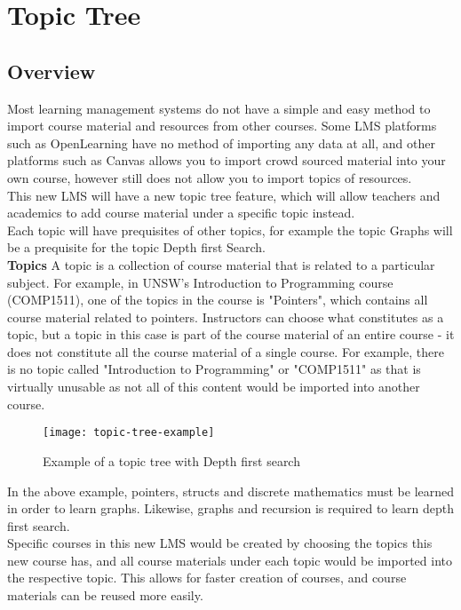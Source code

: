 \section{Topic Tree}
\subsection{Overview}
Most learning management systems do not have a simple and easy method to import course material and resources from other courses. Some LMS platforms such as OpenLearning have no method of importing any data at all, and other platforms such as Canvas allows you to import crowd sourced material into your own course, however still does not allow you to import topics of resources. \\

This new LMS will have a new topic tree feature, which will allow teachers and academics to add course material under a specific topic instead.\\
Each topic will have prequisites of other topics, for example the topic Graphs will be a prequisite for the topic Depth first Search.\\

\textbf{Topics}
A topic is a collection of course material that is related to a particular subject. For example, in UNSW's Introduction to Programming course (COMP1511), one of the topics in the course is "Pointers", which contains all course material related to pointers. Instructors can choose what constitutes as a topic, but a topic in this case is part of the course material of an entire course - it does not constitute all the course material of a single course. For example, there is no topic called "Introduction to Programming" or "COMP1511" as that is virtually unusable as not all of this content would be imported into another course.


\begin{figure}[h!]
    \centering
    \texttt{[image: topic-tree-example]}
    \caption{Example of a topic tree with Depth first search}
\end{figure}

In the above example, pointers, structs and discrete mathematics must be learned in order to learn graphs. Likewise, graphs and recursion is required to learn depth first search.\\


Specific courses in this new LMS would be created by choosing the topics this new course has, and all course materials under each topic would be imported into the respective topic. This allows for faster creation of courses, and course materials can be reused more easily.\\

